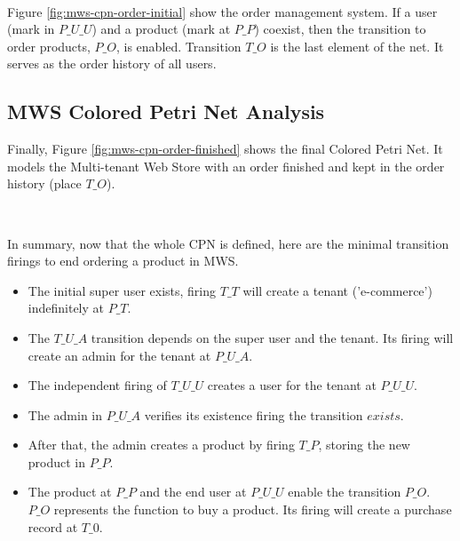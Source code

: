 \documentclass[12pt,english]{article} %
\begin{document}
\

Figure \ref{fig:mws-cpn-order-initial} show the order management system.
If a user (mark in $P\_U\_U$) and a product (mark at $P\_P$) coexist, then the transition to order products, $P\_O$, is enabled.
Transition $T\_O$ is the last element of the net.
It serves as the order history of all users.

\subsection{MWS Colored Petri Net Analysis}
Finally, Figure \ref{fig:mws-cpn-order-finished} shows the final Colored Petri Net.
It models the Multi-tenant Web Store with an order finished and kept in the order history (place $T\_O$).

\

In summary, now that the whole CPN is defined, here are the minimal transition firings to end ordering a product in MWS.

\begin{itemize}
    \item The initial super user exists, firing $T\_T$ will create a tenant ('e-commerce') indefinitely at $P\_T$.
    \item The $T\_U\_A$ transition depends on the super user and the tenant. Its firing will create an admin for the tenant at $P\_U\_A$.
    \item The independent firing of $T\_U\_U$ creates a user for the tenant at $P\_U\_U$.
    \item The admin in $P\_U\_A$ verifies its existence firing the transition $exists$.
    \item After that, the admin creates a product by firing $T\_P$, storing the new product in $P\_P$.
    \item The product at $P\_P$ and the end user at $P\_U\_U$ enable the transition $P\_O$. $P\_O$ represents the function to buy a product. Its firing will create a purchase record at $T\_0$.
\end{itemize}

\
\end{document}
